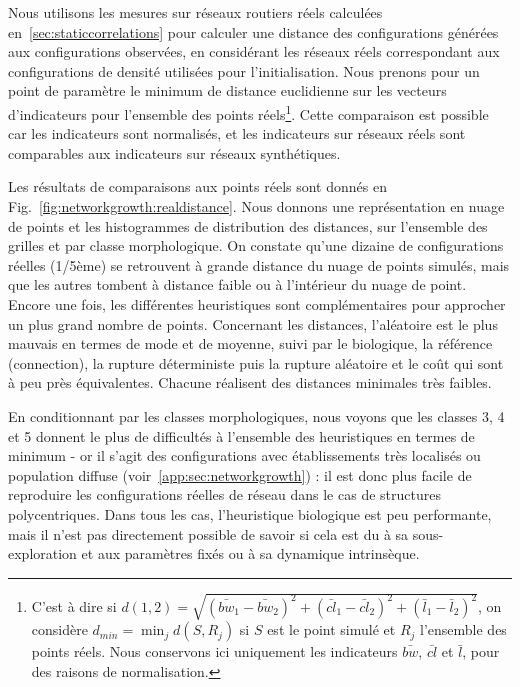 Nous utilisons les mesures sur réseaux routiers réels calculées en~\ref{sec:staticcorrelations} pour calculer une distance des configurations générées aux configurations observées, en considérant les réseaux réels correspondant aux configurations de densité utilisées pour l'initialisation. Nous prenons pour un point de paramètre le minimum de distance euclidienne sur les vecteurs d'indicateurs pour l'ensemble des points réels\footnote{C'est à dire si $d(1,2) = \sqrt{(\bar{bw}_1 - \bar{bw}_2)^2 + (\bar{cl}_1 - \bar{cl}_2)^2 + (\bar{l}_1 - \bar{l}_2)^2}$, on considère $d_{min} = \min_j d(S,R_j)$ si $S$ est le point simulé et $R_j$ l'ensemble des points réels. Nous conservons ici uniquement les indicateurs $\bar{bw}$, $\bar{cl}$ et $\bar{l}$, pour des raisons de normalisation.}. Cette comparaison est possible car les indicateurs sont normalisés, et les indicateurs sur réseaux réels sont comparables aux indicateurs sur réseaux synthétiques.


Les résultats de comparaisons aux points réels sont donnés en Fig.~\ref{fig:networkgrowth:realdistance}. Nous donnons une représentation en nuage de points et les histogrammes de distribution des distances, sur l'ensemble des grilles et par classe morphologique. On constate qu'une dizaine de configurations réelles (1/5ème) se retrouvent à grande distance du nuage de points simulés, mais que les autres tombent à distance faible ou à l'intérieur du nuage de point. Encore une fois, les différentes heuristiques sont complémentaires pour approcher un plus grand nombre de points. Concernant les distances, l'aléatoire est le plus mauvais en termes de mode et de moyenne, suivi par le biologique, la référence (connection), la rupture déterministe puis la rupture aléatoire et le coût qui sont à peu près équivalentes. Chacune réalisent des distances minimales très faibles.


En conditionnant par les classes morphologiques, nous voyons que les classes 3, 4 et 5 donnent le plus de difficultés à l'ensemble des heuristiques en termes de minimum - or il s'agit des configurations avec établissements très localisés ou population diffuse (voir~\ref{app:sec:networkgrowth}) : il est donc plus facile de reproduire les configurations réelles de réseau dans le cas de structures polycentriques. Dans tous les cas, l'heuristique biologique est peu performante, mais il n'est pas directement possible de savoir si cela est du à sa sous-exploration et aux paramètres fixés ou à sa dynamique intrinsèque.






